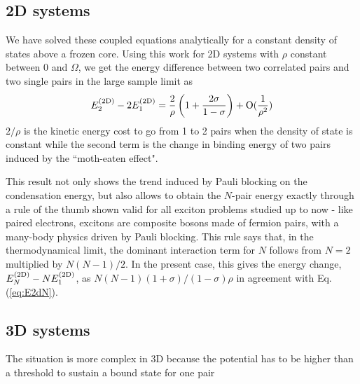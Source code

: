 \documentclass[5p,twocolumn]{elsarticle}
\begin{document}
\subsection{2D systems}
We have solved these coupled equations analytically for a constant density of states above a frozen core\cite{combescotBCS}.  Using  this work  for 2D systems with $\rho$ constant between $0$ and $\Omega$, we get the energy difference between two correlated pairs and two single pairs in the large sample limit as 
\begin{equation}
E^{{{\text{(2D)}}}}_2-2E_1^{{{\text{(2D)}}}}=\frac{2}{\rho}\left(1+\frac{2\sigma}{1-\sigma}\right)+\text{O}(\frac{1}{\rho^2})
\label{eq:}
\end{equation}
 $2/\rho$ is the kinetic energy cost to go from 1 to 2 pairs when the density of state is constant while the second term is the change in binding energy of two pairs induced by the ``moth-eaten effect". 

This result not only shows the trend induced by Pauli blocking on the condensation energy, but also allows to obtain the $N$-pair energy exactly through a rule of the thumb shown valid for all exciton problems studied up to now - like paired electrons, excitons are composite bosons made of fermion pairs, with a many-body physics driven by Pauli blocking.  This rule says that, in the thermodynamical limit, the dominant interaction term for $N$ follows from $N= 2$ multiplied by $N(N-1)/2$.  In the present case, this gives the energy change, $E^{{{\text{(2D)}}}}_N-NE^{{{\text{(2D)}}}}_1$, as $N(N-1)(1+\sigma)/(1-\sigma)\rho$ in agreement with
Eq.(\ref{eq:E2dN}).


\subsection{3D systems}

The situation is more complex in 3D because the potential has to be higher than a threshold to sustain a bound state for one pair
\end{document}
